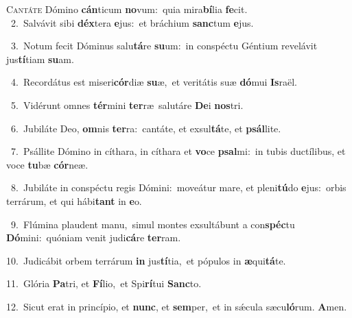 \lettrine{\initial\textcolor{\initialcolor}{C}}{antáte} Dómino \textbf{cán}\-ticum \textbf{no}\-vum:~\star quia mira\-\textbf{bí}\-lia \textbf{fe}\-cit.\\
{\numbfont\textcolor{\numbcolor}{~2.}}~Salvávit sibi \textbf{déx}\-tera \textbf{e}\-jus:~\star et bráchium \textbf{sanc}\-tum \textbf{e}\-jus.\par
{\numbfont\textcolor{\numbcolor}{~3.}}~Notum fecit Dóminus salu\-\textbf{tá}\-re \textbf{su}\-um:~\star in conspéctu Géntium revelávit jus\-\textbf{tí}\-tiam \textbf{su}\-am.\par
{\numbfont\textcolor{\numbcolor}{~4.}}~Recordátus est miseri\-\textbf{cór}\-diæ \textbf{su}\-æ,~\star et veritátis suæ \textbf{dó}\-mui \textbf{Is}\-raël.\par
{\numbfont\textcolor{\numbcolor}{~5.}}~Vidérunt omnes \textbf{tér}\-mini \textbf{ter}\-ræ~\star salutáre \textbf{De}\-i \textbf{nos}\-tri.\par
{\numbfont\textcolor{\numbcolor}{~6.}}~Jubiláte Deo, \textbf{om}\-nis \textbf{ter}\-ra:~\star cantáte, et exsul\-\textbf{tá}\-te, et \textbf{psál}\-lite.\par
{\numbfont\textcolor{\numbcolor}{~7.}}~Psállite Dómino in cíthara, in cíthara et \textbf{vo}\-ce \textbf{psal}\-mi:~\star in tubis ductílibus, et voce \textbf{tu}\-bæ \textbf{cór}\-neæ.\par
{\numbfont\textcolor{\numbcolor}{~8.}}~Jubiláte in conspéctu regis Dómini:~\dagger moveátur mare, et pleni\-\textbf{tú}\-do \textbf{e}\-jus:~\star orbis terrárum, et qui hábi\textbf{tant} in \textbf{e}\-o.\par
{\numbfont\textcolor{\numbcolor}{~9.}}~Flúmina plaudent manu,~\dagger simul montes exsultábunt a con\-\textbf{spéc}\-tu \textbf{Dó}\-mini:~\star quóniam venit judi\-\textbf{cá}\-re \textbf{ter}\-ram.\par
{\numbfont\textcolor{\numbcolor}{10.}}~Judicábit orbem terrárum \textbf{in} jus\-\textbf{tí}\-tia,~\star et pópulos in \textbf{æ}\-qui\-\textbf{tá}\-te.\par
{\numbfont\textcolor{\numbcolor}{11.}}~Glória \textbf{Pa}\-tri, et \textbf{Fí}\-lio,~\star et Spi\-\textbf{rí}\-tui \textbf{Sanc}\-to.\par
{\numbfont\textcolor{\numbcolor}{12.}}~Sicut erat in princípio, et \textbf{nunc}\-, et \textbf{sem}\-per,~\star et in sǽcula sæcu\-\textbf{ló}\-rum. \textbf{A}\-men.\par
